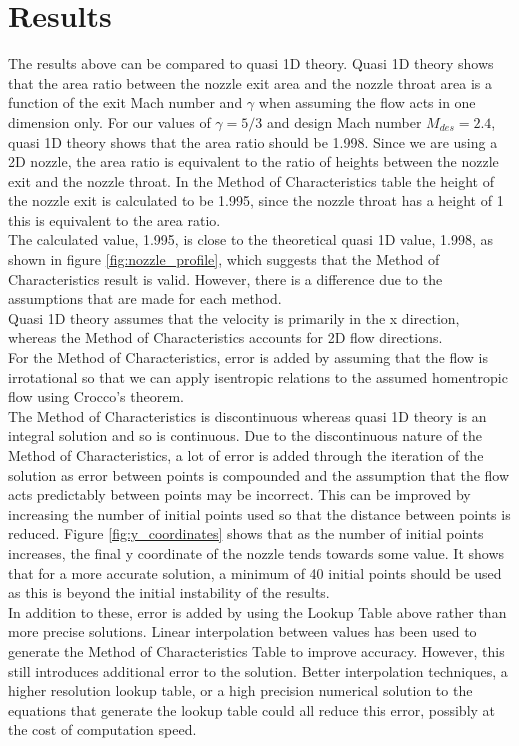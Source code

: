 \documentclass[10pt,a4paper]{article}
\begin{document}
\section{Results}
The results above can be compared to quasi 1D theory. Quasi 1D theory shows that the area ratio between the nozzle exit area and the nozzle throat area is a function of the exit Mach number and $\gamma$ when assuming the flow acts in one dimension only. For our values of $\gamma = 5/3$ and design Mach number $M_{des}=2.4$, quasi 1D theory shows that the area ratio should be 1.998. Since we are using a 2D nozzle, the area ratio is equivalent to the ratio of heights between the nozzle exit and the nozzle throat. In the Method of Characteristics table the height of the nozzle exit is calculated to be 1.995, since the nozzle throat has a height of 1 this is equivalent to the area ratio.
\\The calculated value, 1.995, is close to the theoretical quasi 1D value, 1.998, as shown in figure \ref{fig:nozzle_profile}, which suggests that the Method of Characteristics result is valid. However, there is a difference due to the assumptions that are made for each method.
\\Quasi 1D theory assumes that the velocity is primarily in the x direction, whereas the Method of Characteristics accounts for 2D flow directions. 
\\For the Method of Characteristics, error is added by assuming that the flow is irrotational so that we can apply isentropic relations to the assumed homentropic flow using Crocco's theorem.
\\The Method of Characteristics is discontinuous whereas quasi 1D theory is an integral solution and so is continuous. Due to the discontinuous nature of the Method of Characteristics, a lot of error is added through the iteration of the solution as error between points is compounded and the assumption that the flow acts predictably between points may be incorrect. This can be improved by increasing the number of initial points used so that the distance between points is reduced. Figure \ref{fig:y_coordinates} shows that as the number of initial points increases, the final y coordinate of the nozzle tends towards some value. It shows that for a more accurate solution, a minimum of 40 initial points should be used as this is beyond the initial instability of the results.
\\In addition to these, error is added by using the Lookup Table above rather than more precise solutions. Linear interpolation between values has been used to generate the Method of Characteristics Table to improve accuracy. However, this still introduces additional error to the solution. Better interpolation techniques, a higher resolution lookup table, or a high precision numerical solution to the equations that generate the lookup table could all reduce this error, possibly at the cost of computation speed.
\end{document}
